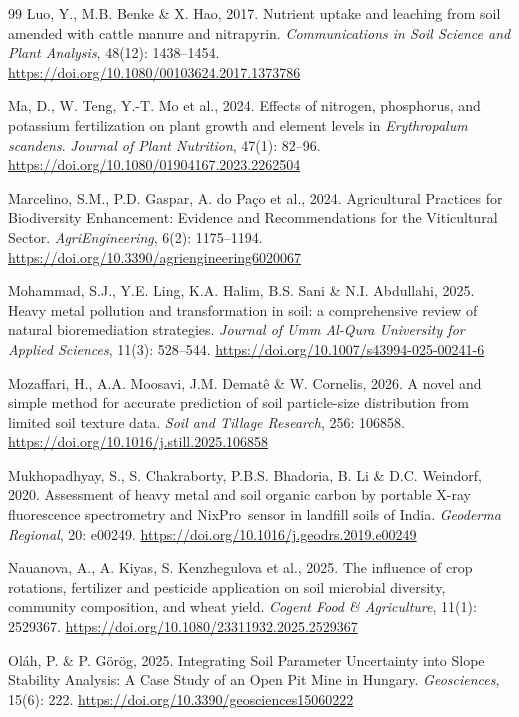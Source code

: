 \documentclass[sn-mathphys-num]{sn-jnl}
\begin{document}
\begin{thebibliography}{99}
Luo, Y., M.B. Benke \& X. Hao, 2017.
Nutrient uptake and leaching from soil amended with cattle manure and
nitrapyrin.
\textit{Communications in Soil Science and Plant Analysis},
48(12): 1438--1454.
\url{https://doi.org/10.1080/00103624.2017.1373786}

Ma, D., W. Teng, Y.-T. Mo et al., 2024.
Effects of nitrogen, phosphorus, and potassium fertilization on plant growth
and element levels in \textit{Erythropalum scandens}.
\textit{Journal of Plant Nutrition}, 47(1): 82--96.
\url{https://doi.org/10.1080/01904167.2023.2262504}

Marcelino, S.M., P.D. Gaspar, A. do Pa\c{c}o et al., 2024.
Agricultural Practices for Biodiversity Enhancement: Evidence and
Recommendations for the Viticultural Sector.
\textit{AgriEngineering}, 6(2): 1175--1194.
\url{https://doi.org/10.3390/agriengineering6020067}

Mohammad, S.J., Y.E. Ling, K.A. Halim, B.S. Sani \& N.I. Abdullahi, 2025.
Heavy metal pollution and transformation in soil: a comprehensive review of
natural bioremediation strategies.
\textit{Journal of Umm Al-Qura University for Applied Sciences},
11(3): 528--544.
\url{https://doi.org/10.1007/s43994-025-00241-6}

Mozaffari, H., A.A. Moosavi, J.M. Demat\^{e} \& W. Cornelis, 2026.
A novel and simple method for accurate prediction of soil particle-size
distribution from limited soil texture data.
\textit{Soil and Tillage Research}, 256: 106858.
\url{https://doi.org/10.1016/j.still.2025.106858}

Mukhopadhyay, S., S. Chakraborty, P.B.S. Bhadoria, B. Li \&
D.C. Weindorf, 2020.
Assessment of heavy metal and soil organic carbon by portable X-ray
fluorescence spectrometry and NixPro\texttrademark\ sensor in landfill soils
of India.
\textit{Geoderma Regional}, 20: e00249.
\url{https://doi.org/10.1016/j.geodrs.2019.e00249}

Nauanova, A., A. Kiyas, S. Kenzhegulova et al., 2025.
The influence of crop rotations, fertilizer and pesticide application on soil
microbial diversity, community composition, and wheat yield.
\textit{Cogent Food \& Agriculture}, 11(1): 2529367.
\url{https://doi.org/10.1080/23311932.2025.2529367}

Ol\'{a}h, P. \& P. G\"{o}r\"{o}g, 2025.
Integrating Soil Parameter Uncertainty into Slope Stability Analysis: A Case
Study of an Open Pit Mine in Hungary.
\textit{Geosciences}, 15(6): 222.
\url{https://doi.org/10.3390/geosciences15060222}


\end{thebibliography}
\end{document}
